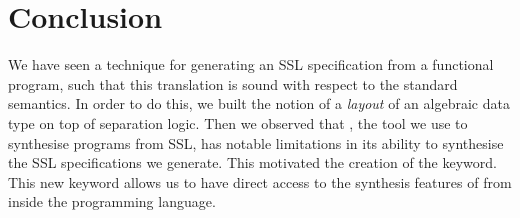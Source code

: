 \section{Conclusion}
\label{sec:conclusion}

We have seen a technique for generating an SSL specification from a functional program, such that this translation is sound with respect to the standard semantics. In order to do this, we built the notion of a \textit{layout} of an algebraic data type on top of separation logic. Then we observed that \SuSLik, the tool we use to synthesise programs from SSL, has notable limitations in its ability to synthesise the SSL specifications we generate. This motivated the creation of the \synth{} keyword. This new keyword allows us to have direct access to the synthesis features of \SuSLik{} from inside the \Pika{} programming language.

